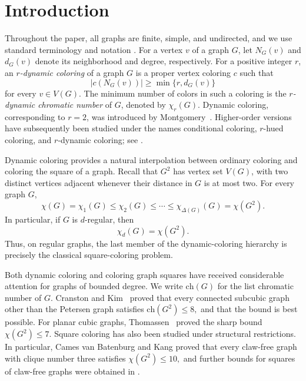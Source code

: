 \section{Introduction}

Throughout the paper, all graphs are finite, simple, and undirected,
and we use standard terminology and notation
\cite{bondy_graph_2008,diestel_graph_2017}.
For a vertex $v$ of a graph $G$, let $N_G(v)$ and $d_G(v)$ denote its
neighborhood and degree, respectively.
For a positive integer $r$, an \emph{$r$-dynamic coloring} of a graph
$G$ is a proper vertex coloring $c$ such that
\[
|c(N_G(v))|\ge \min\{r,d_G(v)\}
\]
for every $v\in V(G)$. The minimum number of colors in such a coloring
is the \emph{$r$-dynamic chromatic number} of $G$, denoted by
$\chi_r(G)$. Dynamic coloring, corresponding to $r=2$, was introduced
by Montgomery~\cite{montgomery2001dynamic}. Higher-order versions have
subsequently been studied under the names conditional coloring,
$r$-hued coloring, and $r$-dynamic coloring; see
\cite{CHEN202224,LAI20061997}.

Dynamic coloring provides a natural interpolation between ordinary
coloring and coloring the square of a graph. Recall that $G^2$ has
vertex set $V(G)$, with two distinct vertices adjacent whenever their
distance in $G$ is at most two. For every graph $G$,
\begin{equation}\label{eq:absolute-bounds}
\chi(G)=\chi_1(G)
\le \chi_2(G)
\le\cdots\le
\chi_{\Delta(G)}(G)
=\chi(G^2).
\end{equation}
In particular, if $G$ is $d$-regular, then
\begin{equation}\label{eq:regular-square}
\chi_d(G)=\chi(G^2).
\end{equation}
Thus, on regular graphs, the last member of the dynamic-coloring
hierarchy is precisely the classical square-coloring problem.

Both dynamic coloring and coloring graph squares have received
considerable attention for graphs of bounded degree. We write
$\text{ch}(G)$ for the list chromatic number of $G$.
Cranston and Kim~\cite{CranstonKim2008} proved that every connected
subcubic graph other than the Petersen graph satisfies
$
\text{ch}(G^2)\le8,
$
and that the bound is best possible. For planar cubic graphs,
Thomassen~\cite{Thomassen2018} proved the sharp bound
$
\chi(G^2)\le7.
$
Square coloring has also been studied under structural restrictions.
In particular, Cames van Batenburg and Kang
\cite{CamesVanBatenburgKang2019} proved that every claw-free graph
with clique number three satisfies
$
\chi(G^2)\le10,
$
and further bounds for squares of claw-free graphs were obtained in
\cite{DeJoannisKangPastor2019}.

